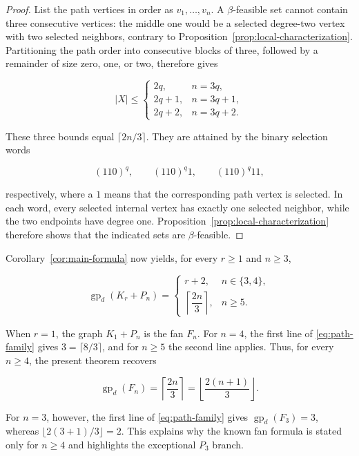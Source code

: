 \documentclass[11pt,a4paper]{article}
\numberwithin{equation}{section}
\begin{document}
\begin{proof}
List the path vertices in order as \(v_1,\ldots,v_n\). A
\(\beta\)-feasible set cannot contain three consecutive vertices: the
middle one would be a selected degree-two vertex with two selected
neighbors, contrary to Proposition~\ref{prop:local-characterization}. Partitioning the path order into
consecutive blocks of three, followed by a remainder of size zero, one,
or two, therefore gives

\[
|X|\le
\begin{cases}
2q,&n=3q,\\
2q+1,&n=3q+1,\\
2q+2,&n=3q+2.
\end{cases}
\]

These three bounds equal \(\lceil 2n/3\rceil\). They are attained by the
binary selection words

\[
(110)^q,\qquad (110)^q1,\qquad (110)^q11,
\]

respectively, where a \(1\) means that the corresponding path vertex is
selected. In each word, every selected internal vertex has exactly one
selected neighbor, while the two endpoints have degree one.
Proposition~\ref{prop:local-characterization} therefore shows that the
indicated sets are \(\beta\)-feasible.
\end{proof}

Corollary~\ref{cor:main-formula} now yields, for every \(r\ge 1\) and \(n\ge 3\),

\begin{equation}\label{eq:path-family}
\operatorname{gp}_d(K_r+P_n)=
\begin{cases}
r+2,&n\in\{3,4\},\\
\left\lceil\dfrac{2n}{3}\right\rceil,&n\ge 5.
\end{cases}
\end{equation}

When \(r=1\), the graph \(K_1+P_n\) is the fan \(F_n\). For \(n=4\), the
first line of \eqref{eq:path-family} gives \(3=\lceil 8/3\rceil\), and for \(n\ge 5\) the
second line applies. Thus, for every \(n\ge 4\), the present theorem
recovers

\[
\operatorname{gp}_d(F_n)
=\left\lceil\frac{2n}{3}\right\rceil
=\left\lfloor\frac{2(n+1)}{3}\right\rfloor.
\]

For \(n=3\), however, the first line of \eqref{eq:path-family} gives
\(\operatorname{gp}_d(F_3)=3\), whereas
\(\lfloor 2(3+1)/3\rfloor=2\). This explains why the known fan formula is
stated only for \(n\ge 4\) and highlights the exceptional \(P_3\) branch.
\end{document}
